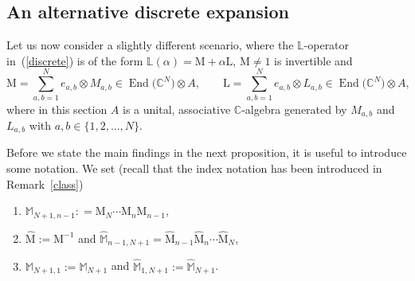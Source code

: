 \documentclass[10pt,a4paper]{amsart}
\numberwithin{equation}{section}
\newcounter{diff_order}
\newcounter{diff_power}
\theoremstyle{definition}
\DeclareMathOperator{\EEnd}{End}%
\def\mathfrak#1{#1}%
\def\mathcal#1{#1}%
\begin{document}
\subsection{An alternative discrete expansion}\label{section3.1}
 {Let us now consider a slightly different scenario, where the ${\mathbb L}$-operator in~(\ref{discrete}) is of the form ${\mathbb L}(\alpha) = {\mathrm M} + \alpha {\mathrm L}$, ${\mathrm M} \neq 1$ is invertible and
\[
{\mathrm M} = \sum_{a,b =1}^{\mathcal N} e_{a,b} \otimes M_{a,b} \in \EEnd\bigl({\mathbb C}^{\mathcal N}\bigr) \otimes {\mathfrak A},\qquad
{\mathrm L} = \sum_{a,b =1}^{\mathcal N} e_{a,b} \otimes L_{a,b} \in \EEnd\bigl({\mathbb C}^{\mathcal N}\bigr) \otimes {\mathfrak A},
\]
 where in this section ${\mathfrak A}$ is a unital, associative ${\mathbb C}$-algebra generated by $M_{a,b}$ and $L_{a,b}$ with ${a,b \in \{1,2,\dots, {\mathcal N}\}}$.}

Before we state the main findings in the next proposition, it is useful to introduce some notation. We set (recall that the index notation has been introduced in Remark~\ref{class})
\begin{enumerate}\itemsep=0pt
\item[(1)] ${\mathbb M}_{N+1, n-1}: = {\mathrm M}_N \cdots {\mathrm M}_{n} {\mathrm M}_{n-1}$,
\item[(2)] $\hat {\mathrm M} := {\mathrm M}^{-1}$ and $\hat {\mathbb M}_{n-1, N+1} =\hat {\mathrm M}_{n-1} \hat {\mathrm M}_{n} \cdots \hat {\mathrm M}_N$,
\item[(3)] ${\mathbb M}_{N+1, 1} :={\mathbb M}_{N+1}$ and $\hat {\mathbb M}_{1,N+1} := \hat {\mathbb M}_{N+1}$.
\end{enumerate}
\end{document}
